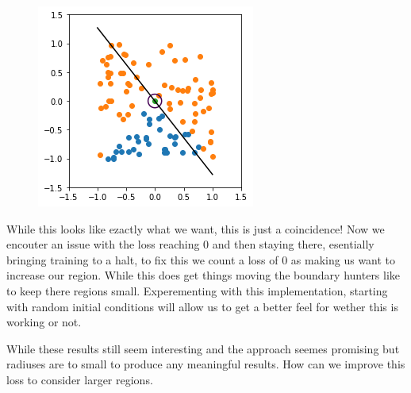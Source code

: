 \documentclass{article}
\begin{document}
\begin{figure}[H]
\centering
  \begin{minipage}[b]{0.4\textwidth}
    \includegraphics[width=\textwidth]{BoundaryHunter-Attempt4-02.png}
    \caption{}
  \end{minipage}
  \hfill
\end{figure}
While this looks like ezactly what we want, this is just a coincidence! Now we encouter an issue with the loss reaching 0 and then staying there, esentially bringing training to a halt, to fix this we count a loss of 0 as making us want to increase our region. While this does get things moving the boundary hunters like to keep there regions small. Experementing with this implementation, starting with random initial conditions will allow us to get a better feel for wether this is working or not.

\begin{figure}[H]
\centering
  \hfill
\end{figure}

While these results still seem interesting and the approach seemes promising but radiuses are to small to produce any meaningful results. How can we improve this loss to consider larger regions.
\end{document}
